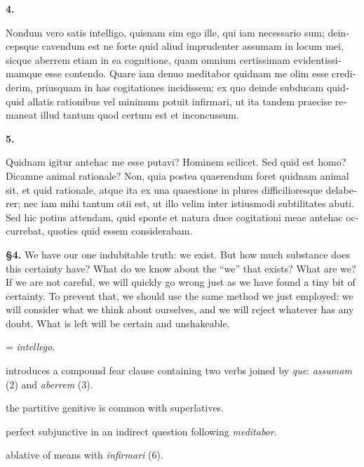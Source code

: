 \clearpage

\beginnumbering
\pstart
    \textbf{4.} \begin{latin}Nondum vero satis intelligo, quisnam sim ego ille, qui iam necessario sum; deincepsque cavendum est ne forte quid aliud imprudenter assumam in locum mei, sicque aberrem etiam in ea cognitione, quam omnium certissimam evidentissimamque esse contendo. Quare iam denuo meditabor quidnam me olim esse crediderim, priusquam in has cogitationes incidissem; ex quo deinde subducam quidquid allatis rationibus vel minimum potuit infirmari, ut ita tandem praecise remaneat illud tantum quod certum est et inconcussum.\end{latin}
\pend
\endnumbering

\beginnumbering
\pstart
    \textbf{5.} \begin{latin}Quidnam igitur antehac me esse putavi? Hominem scilicet. Sed quid est homo? Dicamne animal rationale? Non, quia postea quaerendum foret quidnam animal sit, et quid rationale, atque ita ex una quaestione in plures difficilioresque delaberer; nec iam mihi tantum otii est, ut illo velim inter istiusmodi subtilitates abuti. Sed hic potius attendam, quid sponte  et natura duce cogitationi meae antehac occurrebat, quoties quid essem considerabam.\end{latin}
\pend
\endnumbering

\prenotes

\textbf{§4.} We have our one indubitable truth: we exist. But how much substance does this certainty have? What do we know about the ``we'' that exists? What are we? If we are not careful, we will quickly go wrong just as we have found a tiny bit of certainty. To prevent that, we should use the same method we just employed: we will consider what we think about ourselves, and we will reject whatever has any doubt. What is left will be certain and unshakeable.

 = \textit{intellego}.

 introduces a compound fear clause containing two verbs joined by \textit{que}: \textit{assumam} (2) and \textit{aberrem} (3).

 the partitive genitive is common with superlatives.

 perfect subjunctive in an indirect question following \textit{meditabor}.

 ablative of means with \textit{infirmari} (6).

